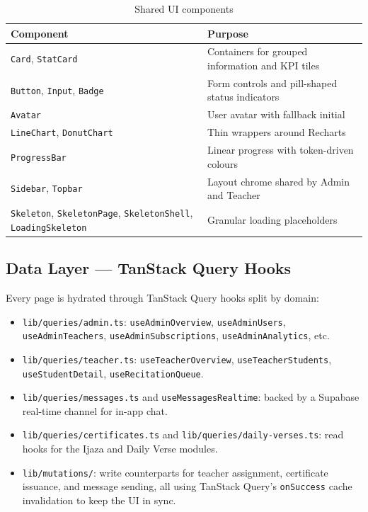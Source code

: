 \begin{table}[H]
  \centering
  \caption{Shared UI components}
  \label{tab:impl_dash_components}
  \renewcommand{\arraystretch}{1.3}
  \small
  \begin{tabularx}{\linewidth}{>{\raggedright\arraybackslash}p{6cm} X}
    \toprule
    \textbf{Component} & \textbf{Purpose} \\
    \midrule
    \texttt{Card}, \texttt{StatCard}     & Containers for grouped information and KPI tiles \\
    \texttt{Button}, \texttt{Input}, \texttt{Badge} & Form controls and pill-shaped status indicators \\
    \texttt{Avatar}                       & User avatar with fallback initial \\
    \texttt{LineChart}, \texttt{DonutChart} & Thin wrappers around Recharts \\
    \texttt{ProgressBar}                  & Linear progress with token-driven colours \\
    \texttt{Sidebar}, \texttt{Topbar}     & Layout chrome shared by Admin and Teacher \\
    \texttt{Skeleton}, \texttt{SkeletonPage}, \texttt{SkeletonShell}, \texttt{LoadingSkeleton} & Granular loading placeholders \\
    \bottomrule
  \end{tabularx}
\end{table}

\subsection{Data Layer --- TanStack Query Hooks}

Every page is hydrated through TanStack Query hooks split by domain:

\begin{itemize}[leftmargin=2em]
  \item \texttt{lib/queries/admin.ts}: \texttt{useAdminOverview}, \texttt{useAdminUsers}, \texttt{useAdminTeachers}, \texttt{useAdminSubscriptions}, \texttt{useAdminAnalytics}, etc.
  \item \texttt{lib/queries/teacher.ts}: \texttt{useTeacherOverview}, \texttt{useTeacherStudents}, \texttt{useStudentDetail}, \texttt{useRecitationQueue}.
  \item \texttt{lib/queries/messages.ts} and \texttt{useMessagesRealtime}: backed by a Supabase real-time channel for in-app chat.
  \item \texttt{lib/queries/certificates.ts} and \texttt{lib/queries/daily-verses.ts}: read hooks for the Ijaza and Daily Verse modules.
  \item \texttt{lib/mutations/}: write counterparts for teacher assignment, certificate issuance, and message sending, all using TanStack Query's \texttt{onSuccess} cache invalidation to keep the UI in sync.
\end{itemize}

